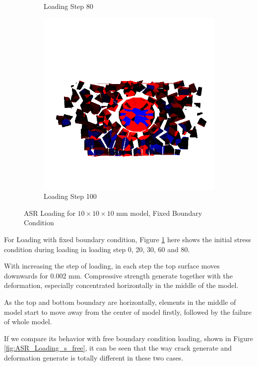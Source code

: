 \begin{figure}[ht!]
\begin{subfigure}{.33\textwidth}
      \caption{Loading Step 80}
      \end{subfigure}%
      \begin{subfigure}{.33\textwidth}
        \centering
        \includegraphics[width=1.0\linewidth]{Files/Small_ASR/IS2/DEP5-STEP(120).png}
        \caption{Loading Step 100}
      \end{subfigure}
  
  \caption{ASR Loading for $10 \times 10 \times 10$ mm model, Fixed Boundary Condition}
  \label{fig:ASR_Loading_s_fix}
\end{figure}

For Loading with fixed boundary condition, Figure \ref{fig:ASR_Loading_s_fix} here shows the initial stress condition during loading in loading step 0, 20, 30, 60 and 80.

With increasing the step of loading, in each step the top surface moves downwards for 0.002 mm. Compressive strength generate together with the deformation, especially concentrated horizontally in the middle of the model.

As the top and bottom boundary are horizontally, elements in the middle of model start to move away from the center of model firstly, followed by the failure of whole model.

If we compare its behavior with free boundary condition loading, shown in Figure \ref{fig:ASR_Loading_s_free}, it can be seen that the way crack generate and deformation generate is totally different in these two cases.

